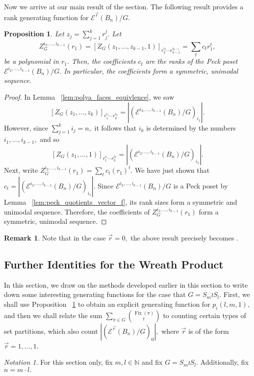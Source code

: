 \documentclass[10 pt]{amsart}
\theoremstyle{plain}
\newtheorem{prop}[thm]{Proposition}
\theoremstyle{definition}
\newtheorem{rem}[thm]{Remark}
\theoremstyle{remark}
\newtheorem{note}[thm]{Notation}
\numberwithin{equation}{section}
\newcommand\ssec{\subsection}
\newcommand\BN{{\mathbb N}}
\renewcommand{\vec}[1]{\overrightarrow{#1}}
\def\Fix{\operatorname{Fix}}
\begin{document}
Now we arrive at our main result of the section. The following result provides a rank generating function for $\mathcal E^{\vec r}(B_n)/G.$

\begin{prop}
\label{prop:rank_gen_fn}
Let $z_j = \sum_{j = 1}^k r_j^j.$ Let $$Z_G^{i_2,\ldots,i_{k-1}}(r_1) =[Z_G(z_1,\ldots, z_{k-1},1)]_{r_2^{i_2}\cdots r_{k-1}^{i_{k-1}}}= \sum_{t}^{}c_tr_1^t,$$ be a polynomial in $r_1.$ Then, the coefficients $c_t$  are the ranks of the Peck poset \linebreak
$\mathcal E^{i_2,\ldots, i_{k-1}}(B_n)/G.$ In particular, the coefficients form a symmetric, unimodal sequence.
\end{prop}
\begin{proof}
In Lemma ~\ref{lem:polya_faces_equivlence}, we saw $$[Z_G(z_1,\ldots, z_k)]_{r_1^{i_1} \cdots r_k^{i_k}}=|(\mathcal E^{i_2,\ldots, i_{k-1}}(B_n)/G)_{i_1}|.$$
However, since $\sum_{j = 1}^k i_j = n,$ it follows that $i_k$ is determined by the numbers $i_1,\ldots, i_{k-1},$ and so 
$$[Z_G(z_1,\ldots, 1)]_{r_1^{i_1} \cdots r_k^{i_k}}=|(\mathcal E^{i_2,\ldots, i_{k-1}}(B_n)/G)_{i_1}|.$$
Next, write $Z_G^{i_2,\ldots,i_{k-1}}(r_1) = \sum_{t} c_t (r_1)^t.$ We have just shown that $c_t = |(\mathcal E^{i_2,\ldots, i_{k-1}}(B_n)/G)_{i_1}|.$ Since $\mathcal E^{i_2,\ldots, i_{k-1}}(B_n)/G$ is a Peck poset by Lemma ~\ref{lem:peck_quotients_vector_f}, its rank sizes form a symmetric and unimodal sequence. Therefore, the coefficients of $Z_G^{i_2,\ldots,i_{k-1}}(r_1)$ form a symmetric, unimodal sequence.
\end{proof}

\begin{rem}
Note that in the case $\vec r = 0,$ the above result precisely becomes \cite[Corollary 7.16]{algebraic_stanley}.
\end{rem}

\ssec{Further Identities for the Wreath Product}
In this section, we draw on the methods developed earlier in this section to write down some interesting generating functions for the case that $G = S_m \wr S_l.$
First, we shall use Proposition ~\ref{prop:rank_gen_fn} to obtain an explicit generating function for $p_i(l,m,1),$ and then we shall relate the sum $\sum_{\pi \in G} \binom{\Fix(\pi)}{t}$ to counting certain types of set partitions, which also count $|(\mathcal E^{\vec r}(B_n)/G)_0|,$ where $\vec r$ is of the form $\vec r = 1,\ldots, 1$.

\begin{note}
For this section only, fix $m,l \in \BN$ and fix $G = S_m \wr S_l.$ Additionally, fix $n = m \cdot l.$
\end{note}
\end{document}
